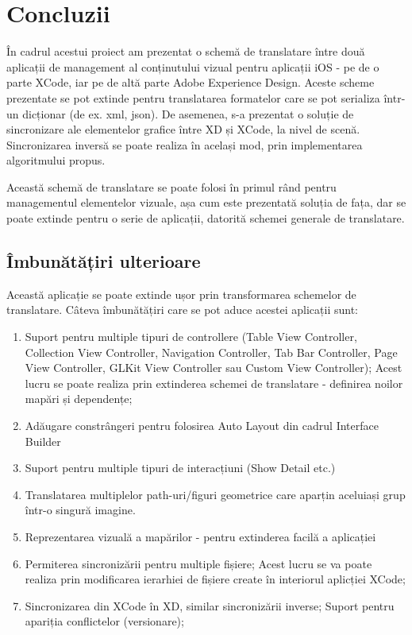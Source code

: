 \chapter{Concluzii}

În cadrul acestui proiect am prezentat o schemă de translatare între două aplicații de management al conținutului vizual pentru aplicații iOS - pe de o parte XCode, iar pe de altă parte Adobe Experience Design. Aceste scheme prezentate se pot extinde pentru translatarea formatelor care se pot serializa într-un dicționar (de ex. xml, json). De asemenea, s-a prezentat o soluție de sincronizare ale elementelor grafice între XD și XCode, la nivel de scenă. Sincronizarea inversă se poate realiza în același mod, prin implementarea algoritmului propus.

Această schemă de translatare se poate folosi în primul rând pentru managementul elementelor vizuale, așa cum este prezentată soluția de fața, dar se poate extinde pentru o serie de aplicații, datorită schemei generale de translatare.

\section{Îmbunătățiri ulterioare}

Această aplicație se poate extinde ușor prin transformarea schemelor de translatare.
Câteva îmbunătățiri care se pot aduce acestei aplicații sunt:

\begin{enumerate}
\item Suport pentru multiple tipuri de controllere (Table View Controller, Collection View Controller, Navigation Controller, Tab Bar Controller, Page View Controller, GLKit View Controller sau Custom View Controller); Acest lucru se poate realiza prin extinderea schemei de translatare - definirea noilor mapări și dependențe;
\item Adăugare constrângeri pentru folosirea Auto Layout din cadrul Interface Builder
\item Suport pentru multiple tipuri de interacțiuni (Show Detail etc.)
\item Translatarea multiplelor path-uri/figuri geometrice care aparțin aceluiași grup într-o singură imagine. 
\item Reprezentarea vizuală a mapărilor - pentru extinderea facilă a aplicației
\item Permiterea sincronizării pentru multiple fișiere; Acest lucru se va poate realiza prin modificarea ierarhiei de fișiere create în interiorul aplicției XCode;
\item Sincronizarea din XCode în XD, similar sincronizării inverse; Suport pentru apariția conflictelor (versionare);
\end{enumerate}


